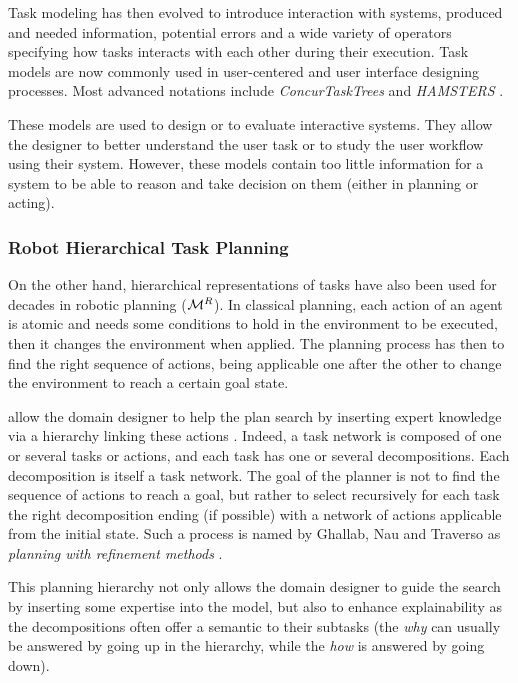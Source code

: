 \documentclass[a4paper,11pt,twoside]{StyleThese}
\begin{document}
Task modeling has then evolved to introduce interaction with systems, produced and needed information, potential errors and a wide variety of operators specifying how tasks interacts with each other during their execution. Task models are now commonly used in user-centered and user interface designing processes. Most advanced notations include \textit{ConcurTaskTrees} \cite{paterno2004concurtasktrees} and \textit{HAMSTERS} \cite{martinie2019analysing}.

These models are used to design or to evaluate interactive systems. They allow the designer to better understand the user task or to study the user workflow using their system. However, these models contain too little information for a system to be able to reason and take decision on them (either in planning or acting).

\subsubsection{Robot Hierarchical Task Planning}
On the other hand, hierarchical representations of tasks have also been used for decades in robotic planning ($\mathcal{M}^R$). In classical planning, each action of an agent is atomic and needs some conditions to hold in the environment to be executed, then it changes the environment when applied. The planning process has then to find the right sequence of actions, being applicable one after the other to change the environment to reach a certain goal state. 

 allow the domain designer to help the plan search by inserting expert knowledge via a hierarchy linking these actions \cite{erol1996complexity}. Indeed, a task network is composed of one or several tasks or actions, and each task has one or several decompositions. Each decomposition is itself a task network. The goal of the planner is not to find the sequence of actions to reach a goal, but rather to select recursively for each task the right decomposition ending (if possible) with a network of actions applicable from the initial state. Such a process is named by Ghallab, Nau and Traverso as \textit{planning with refinement methods} \cite{ghallab_nau_traverso_2016}.

This planning hierarchy not only allows the domain designer to guide the search by inserting some expertise into the model, but also to enhance explainability as the decompositions often offer a semantic to their subtasks (the \textit{why} can usually be answered by going up in the hierarchy, while the \textit{how} is answered by going down).
\end{document}
